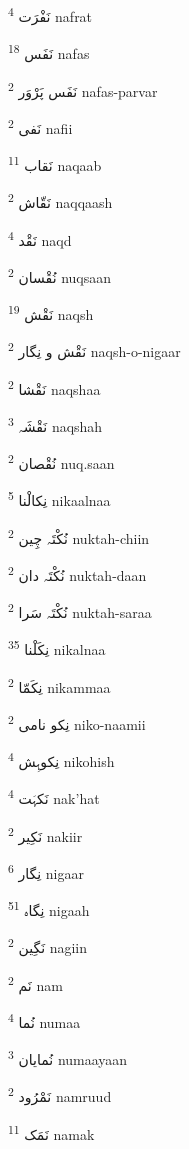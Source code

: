 \documentclass[12pt]{article}
\begin{document}
\begin{RTL}
\begin{multicols}{5}
{\ur نَفْرَت}   \textsuperscript{4} nafrat

{\ur نَفَس}   \textsuperscript{18} nafas

{\ur نَفَس پَرْوَر}   \textsuperscript{2} nafas-parvar

{\ur نَفی}   \textsuperscript{2} nafii

{\ur نَقاب}   \textsuperscript{11} naqaab

{\ur نَقّاش}   \textsuperscript{2} naqqaash

{\ur نَقْد}   \textsuperscript{4} naqd

{\ur نُقْسان}   \textsuperscript{2} nuqsaan

{\ur نَقْش}   \textsuperscript{19} naqsh

{\ur نَقْش و نِگار}   \textsuperscript{2} naqsh-o-nigaar

{\ur نَقْشا}   \textsuperscript{2} naqshaa

{\ur نَقْشَہ}   \textsuperscript{3} naqshah

{\ur نُقْصان}   \textsuperscript{2} nuq.saan

{\ur نِکالْنا}   \textsuperscript{5} nikaalnaa

{\ur نُکْتَہ چِین}   \textsuperscript{2} nuktah-chiin

{\ur نُکْتَہ دان}   \textsuperscript{2} nuktah-daan

{\ur نُکْتَہ سَرا}   \textsuperscript{2} nuktah-saraa

{\ur نِکَلْنا}   \textsuperscript{35} nikalnaa

{\ur نِکَمّا}   \textsuperscript{2} nikammaa

{\ur نِکو نامی}   \textsuperscript{2} niko-naamii

{\ur نِکوہِش}   \textsuperscript{4} nikohish

{\ur نَکہَت}   \textsuperscript{4} nak'hat

{\ur نَکِیر}   \textsuperscript{2} nakiir

{\ur نِگار}   \textsuperscript{6} nigaar

{\ur نِگاہ}   \textsuperscript{51} nigaah

{\ur نَگِین}   \textsuperscript{2} nagiin

{\ur نَم}   \textsuperscript{2} nam

{\ur نُما}   \textsuperscript{4} numaa

{\ur نُمایان}   \textsuperscript{3} numaayaan

{\ur نَمْرُود}   \textsuperscript{2} namruud

{\ur نَمَک}   \textsuperscript{11} namak


\end{multicols}
\end{RTL}
\end{document}
